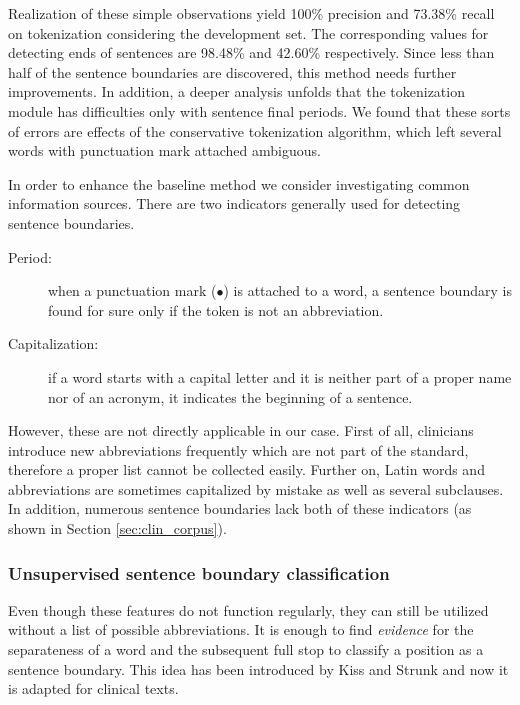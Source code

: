 Realization of these simple observations yield 100\% precision and 73.38\% recall on tokenization considering the development set. 
The corresponding values for detecting ends of sentences are 98.48\% and 42.60\% respectively. 
Since less than half of the sentence boundaries are discovered, this method needs further improvements.
In addition, a deeper analysis unfolds that the tokenization module has difficulties only with sentence final periods. 
We found that these sorts of errors are effects of the conservative tokenization algorithm, which left several words with punctuation mark attached ambiguous.


In order to enhance the baseline method we consider investigating common information sources. 
There are two indicators generally used for detecting sentence boundaries.
\begin{description}
 \item[Period:] when a punctuation mark ($\bullet$) is attached to a word, a sentence boundary is found for sure only if the token is not an abbreviation.
 \item[Capitalization:] if a word starts with a capital letter and it is neither part of a proper name nor of an acronym, it indicates the beginning of a sentence.
\end{description}

However, these are not directly applicable in our case. 
First of all, clinicians introduce new abbreviations frequently which are not part of the standard, therefore a proper list cannot be collected easily. 
Further on, Latin words and abbreviations are sometimes capitalized by mistake as well as several subclauses. 
In addition, numerous sentence boundaries lack both of these indicators (as shown in Section \ref{sec:clin_corpus}).

\subsubsection{Unsupervised sentence boundary classification}

Even though these features do not function regularly, they can still be utilized without a list of possible abbreviations. 
It is enough to find \emph{evidence} for the separateness of a word and the subsequent full stop to classify a position as a sentence boundary. 
This idea has been introduced by Kiss and Strunk \cite{kiss2006unsupervised} and now it is adapted for clinical texts.


